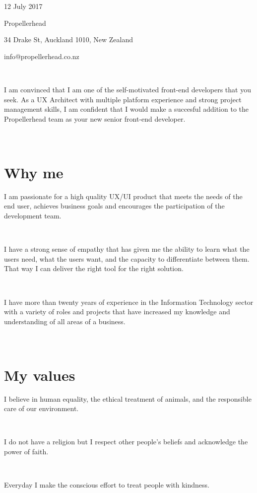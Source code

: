 \documentclass{resume}
\begin{document}



\section{\\ }
  \role{}{}
  12 July 2017\par
  Propellerhead\par
  34 Drake St, Auckland 1010, New Zealand\par
  info@propellerhead.co.nz\par
  ~\par
  I am convinced that I am one of the self-motivated front-end developers that you seek. As a UX Architect with multiple platform experience and strong project management skills, I am confident that I would make a succesful addition to the Propellerhead team as your new senior front-end developer.
  \par

\section{\\ Why me}
  \role{}{}
  I am passionate for a high quality UX/UI product that meets the needs of the end user, achieves business goals and encourages the participation of the development team.\par
  ~\par
  I have a strong sense of empathy that has given me the ability to learn what the users need, what the users want, and the capacity to differentiate between them. That way I can deliver the right tool for the right solution.\par
  ~\par
  I have more than twenty years of experience in the Information Technology sector with a variety of roles and projects that have increased my knowledge and understanding of all areas of a business.\par

\section{\\ My values}
  \role{}{}
  I believe in human equality, the ethical treatment of animals, and the responsible care of our environment.\par
  ~\par
  I do not have a religion but I respect other people's beliefs and acknowledge the power of faith.\par
  ~\par
  Everyday I make the conscious effort to treat people with kindness.\par

%
%
\end{document}
